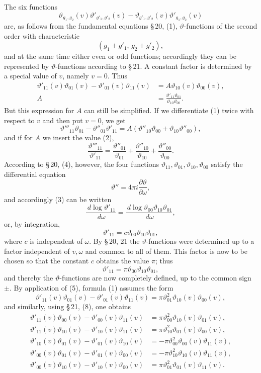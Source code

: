 \documentclass[11pt]{article}
\providecommand{\dd}{\,d}
\providecommand{\tht}{\vartheta}
\begin{document}
The six functions
\[
\tht_{g_1,g_2}(v)\tht'_{g'_1,g'_2}(v)-\tht_{g'_1,g'_2}(v)\tht'_{g_1,g_2}(v)
\]
are, as follows from the fundamental equations \S\,20, (1), $\vartheta$-functions of the second order with characteristic
\[
(g_1+g'_1,\,g_2+g'_2),
\]
and at the same time either even or odd functions; accordingly they can be represented by $\vartheta$-functions according to \S\,21. A constant factor is determined by a special value of $v$, namely $v=0$. Thus
\begin{align}
\tht'_{11}(v)\tht_{01}(v)-\tht'_{01}(v)\tht_{11}(v)&=A\tht_{10}(v)\tht_{00}(v), \tag{1}\\
A&=\frac{\tht'_{11}\tht_{01}}{\tht_{10}\tht_{00}}. \tag{2}
\end{align}
But this expression for $A$ can still be simplified. If we differentiate (1) twice with respect to $v$ and then put $v=0$, we get
\[
\tht'''_{11}\tht_{01}-\tht''_{01}\tht'_{11}=A(\tht''_{10}\tht_{00}+\tht_{10}\tht''_{00}),
\]
and if for $A$ we insert the value (2),
\begin{equation}
\frac{\tht'''_{11}}{\tht'_{11}}=\frac{\tht''_{01}}{\tht_{01}}+
\frac{\tht''_{10}}{\tht_{10}}+\frac{\tht''_{00}}{\tht_{00}}.
\tag{3}
\end{equation}
According to \S\,20, (4), however, the four functions $\tht_{11},\tht_{01},\tht_{10},\tht_{00}$ satisfy the differential equation
\begin{equation}
\tht''=4\pi i\frac{\partial \tht}{\partial \omega},
\tag{4}
\end{equation}
and accordingly (3) can be written
\[
\frac{\dd\log\tht'_{11}}{\dd\omega}=\frac{\dd\log\tht_{00}\tht_{10}\tht_{01}}{\dd\omega},
\]
or, by integration,
\[
\tht'_{11}=c\tht_{00}\tht_{10}\tht_{01},
\]
where $c$ is independent of $\omega$. By \S\,20, 21 the $\vartheta$-functions were determined up to a factor independent of $v,\omega$ and common to all of them. This factor is now to be chosen so that the constant $c$ obtains the value $\pi$; thus
\begin{equation}
\tht'_{11}=\pi\tht_{00}\tht_{10}\tht_{01},
\tag{5}
\end{equation}
and thereby the $\vartheta$-functions are now completely defined, up to the common sign $\pm$. By application of (5), formula (1) assumes the form
\begin{equation}
\tht'_{11}(v)\tht_{01}(v)-\tht'_{01}(v)\tht_{11}(v)=\pi\tht_{01}^{2}\tht_{10}(v)\tht_{00}(v),
\tag{6}
\end{equation}
and similarly, using \S\,21, (8), one obtains
\begin{align}
\tht'_{11}(v)\tht_{00}(v)-\tht'_{00}(v)\tht_{11}(v)&=\pi\tht_{00}^{2}\tht_{10}(v)\tht_{01}(v), \tag{7}\\
\tht'_{11}(v)\tht_{10}(v)-\tht'_{10}(v)\tht_{11}(v)&=\pi\tht_{10}^{2}\tht_{01}(v)\tht_{00}(v), \tag{8}\\
\tht'_{10}(v)\tht_{01}(v)-\tht'_{01}(v)\tht_{10}(v)&=-\pi\tht_{00}^{2}\tht_{00}(v)\tht_{11}(v), \tag{9}\\
\tht'_{00}(v)\tht_{01}(v)-\tht'_{01}(v)\tht_{00}(v)&=-\pi\tht_{10}^{2}\tht_{10}(v)\tht_{11}(v), \tag{10}\\
\tht'_{00}(v)\tht_{10}(v)-\tht'_{10}(v)\tht_{00}(v)&=\pi\tht_{01}^{2}\tht_{01}(v)\tht_{11}(v). \tag{11}
\end{align}
\end{document}
